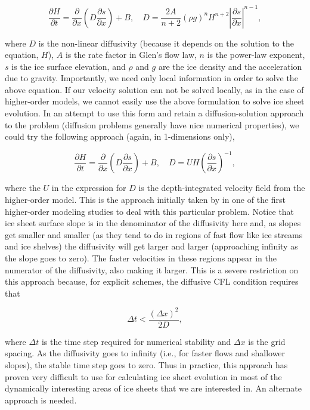 \begin{equation}
\frac{\partial H}{\partial t}=\frac{\partial }{\partial x}\left( D\frac{\partial s}{\partial x} \right)+B,\quad D=\frac{2A}{n+2}\left( \rho g \right)^{n}H^{n+2}\left| \frac{\partial s}{\partial x} \right|^{n-1},
\end{equation}

where $D$ is the non-linear diffusivity (because it depends on the solution to the equation, $H$), $A$ is the rate factor in Glen's flow law, $n$ is the power-law exponent, $s$ is the ice surface elevation, and $\rho$ and $g$ are the ice density and the acceleration due to gravity. Importantly, we need only local information in order to solve the above equation. If our velocity solution can not be solved locally, as in the case of higher-order models, we cannot easily use the above formulation to solve ice sheet evolution. In an attempt to use this form and retain a diffusion-solution approach to the problem (diffusion problems generally have nice numerical properties), we could try the following approach (again, in 1-dimensions only),

\begin{equation}
\frac{\partial H}{\partial t}=\frac{\partial }{\partial x}\left( D\frac{\partial s}{\partial x} \right)+B,\quad D=UH\left( \frac{\partial s}{\partial x} \right)^{-1},
\end{equation}

where the $U$ in the expression for $D$ is the depth-integrated velocity field from the higher-order model. This is the approach initially taken by \citet{Pattyn:2003tj} in one of the first higher-order modeling studies to deal with this particular problem. Notice that ice sheet surface slope is in the denominator of the diffusivity here and, as slopes get smaller and smaller (as they tend to do in regions of fast flow like ice streams and ice shelves) the diffusivity will get larger and larger (approaching infinity as the slope goes to zero). The faster velocities in these regions appear in the numerator of the diffusivity, also making it larger. This is a severe restriction on this approach because, for explicit schemes, the diffusive CFL condition requires that

\begin{equation}
\Delta t<\frac{\left( \Delta x \right)^{2}}{2D},
\end{equation}

where $\Delta t$ is the time step required for numerical stability and $\Delta x$ is the grid spacing. As the diffusivity goes to infinity (i.e., for faster flows and shallower slopes), the stable time step goes to zero. Thus in practice, this approach has proven very difficult to use for calculating ice sheet evolution in most of the dynamically interesting areas of ice sheets that we are interested in. An alternate approach is needed.

